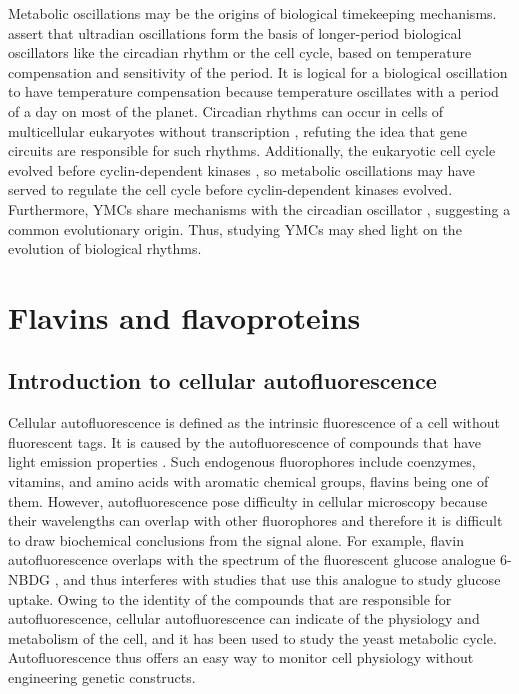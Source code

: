 Metabolic oscillations may be the origins of biological timekeeping mechanisms.
\citet{lloydRedoxRhythmicityClocks2007} assert that ultradian oscillations form the basis of longer-period biological oscillators like the circadian rhythm or the cell cycle, based on temperature compensation and sensitivity of the period.
It is logical for a biological oscillation to have temperature compensation because temperature oscillates with a period of a day on most of the planet.
Circadian rhythms can occur in cells of multicellular eukaryotes without transcription \citep{oneillCircadianRhythmsPersist2011}, refuting the idea that gene circuits are responsible for such rhythms.
Additionally, the eukaryotic cell cycle evolved before cyclin-dependent kinases \citep{papagiannakisAutonomousMetabolicOscillations2017}, so metabolic oscillations may have served to regulate the cell cycle before cyclin-dependent kinases evolved.
Furthermore, YMCs share mechanisms with the circadian oscillator \citep{caustonMetabolicCyclesYeast2015,arataQuantitativeStudiesCellDivision2019}, suggesting a common evolutionary origin.
Thus, studying YMCs may shed light on the evolution of biological rhythms.

\section{Flavins and flavoproteins}
\label{sec:intro-flavin}

\subsection{Introduction to cellular autofluorescence}
\label{subsec:intro-flavin-autofluo}

Cellular autofluorescence is defined as the intrinsic fluorescence of a cell without fluorescent tags.
It is caused by the autofluorescence of compounds that have light emission properties \parencite{maslankaAutofluorescenceYeastSaccharomyces2018}.
Such endogenous fluorophores include coenzymes, vitamins, and amino acids with aromatic chemical groups, flavins being one of them.
However, autofluorescence pose difficulty in cellular microscopy because their wavelengths can overlap with other fluorophores and therefore it is difficult to draw biochemical conclusions from the signal alone.
For example, flavin autofluorescence overlaps with the spectrum of the fluorescent glucose analogue 6-NBDG \parencite{maslankaAutofluorescenceYeastSaccharomyces2018}, and thus interferes with studies that use this analogue to study glucose uptake.
Owing to the identity of the compounds that are responsible for autofluorescence, cellular autofluorescence can indicate of the physiology and metabolism of the cell, and it has been used to study the yeast metabolic cycle.
Autofluorescence thus offers an easy way to monitor cell physiology without engineering genetic constructs.

